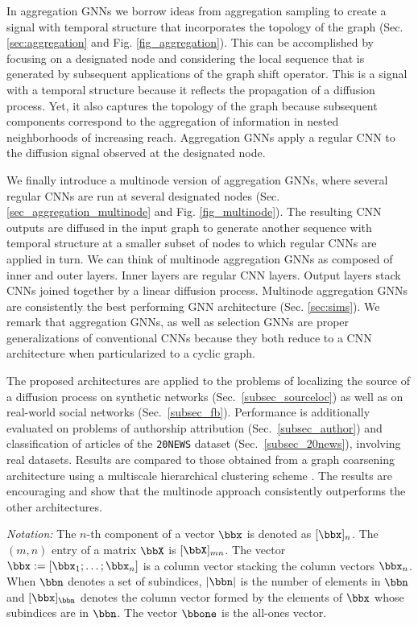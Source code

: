 In aggregation GNNs we borrow ideas from aggregation sampling \cite{marques16-aggregation} to create a signal with temporal structure that incorporates the topology of the graph (Sec. \ref{sec:aggregation} and Fig. \ref{fig_aggregation}). This can be accomplished by focusing on a designated node and considering the local sequence that is generated by subsequent applications of the graph shift operator. This is a signal with a temporal structure because it reflects the propagation of a diffusion process. Yet, it also captures the topology of the graph because subsequent components correspond to the aggregation of information in nested neighborhoods of increasing reach. Aggregation GNNs apply a regular CNN to the diffusion signal observed at the designated node. 

We finally introduce a multinode version of aggregation GNNs, where several regular CNNs are run at several designated nodes (Sec. \ref{sec_aggregation_multinode} and Fig. \ref{fig_multinode}). The resulting CNN outputs are diffused in the input graph to generate another sequence with temporal structure at a smaller subset of nodes to which regular CNNs are applied in turn. We can think of multinode aggregation GNNs as composed of inner and outer layers. Inner layers are regular CNN layers. Output layers stack CNNs joined together by a linear diffusion process. Multinode aggregation GNNs are consistently the best performing GNN architecture (Sec. \ref{sec:sims}). We remark that aggregation GNNs, as well as selection GNNs are proper generalizations of conventional CNNs because they both reduce to a CNN architecture when particularized to a cyclic graph.

The proposed architectures are applied to the problems of localizing the source of a diffusion process on synthetic networks (Sec.~\ref{subsec_sourceloc}) as well as on real-world social networks (Sec.~\ref{subsec_fb}). Performance is additionally evaluated on problems of authorship attribution (Sec.~\ref{subsec_author}) and classification of articles of the \texttt{20NEWS} dataset (Sec.~\ref{subsec_20news}), involving real datasets. Results are compared to those obtained from a graph coarsening architecture using a multiscale hierarchical clustering scheme \cite{defferrard17-cnngraphs}. The results are encouraging and show that the multinode approach consistently outperforms the other architectures.

\noindent \emph{Notation:} The $n$-th component of a vector $\bbx$ is denoted as $[\bbx]_{n}$. The $(m,n)$ entry of a matrix $\bbX$ is $[\bbX]_{mn}$. The vector $\bbx:=[\bbx_1; \ldots; \bbx_n]$ is a column vector stacking the column vectors $\bbx_n$. When $\bbn$ denotes a set of subindices, $|\bbn|$ is the number of elements in $\bbn$ and  $[\bbx]_{\bbn}$ denotes the column vector formed by the elements of $\bbx$ whose subindices are in $\bbn$. The vector $\bbone$ is the all-ones vector. 
